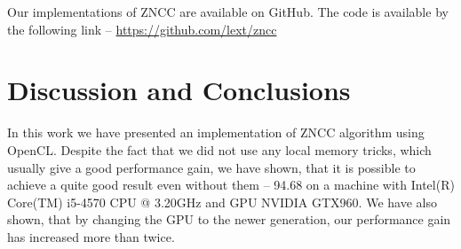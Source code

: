\documentclass[conference]{IEEEtran}
\begin{document}
Our implementations of ZNCC are available on GitHub. The code is available by the following link -- \url{https://github.com/lext/zncc}

\section{Discussion and Conclusions}
In this work we have presented an implementation of ZNCC algorithm using OpenCL. Despite the fact that we did not use any local memory tricks, which usually give a good performance gain, we have shown, that it is possible to  achieve a quite good result even without them -- 94.68 on a machine with Intel(R) Core(TM) i5-4570 CPU @ 3.20GHz and GPU NVIDIA GTX960. We have also shown, that by changing the GPU to the newer generation, our performance gain has increased more than twice.



\end{document}
